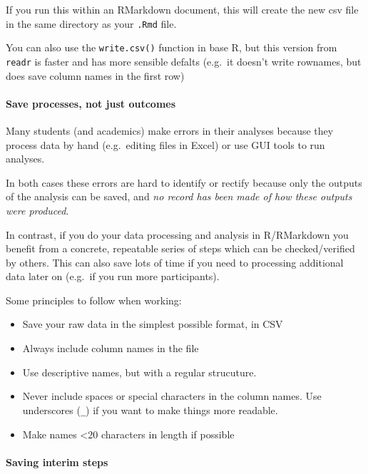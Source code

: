 \documentclass[]{article}
\let\oldparagraph\paragraph
\renewcommand{\paragraph}[1]{\oldparagraph{#1}\mbox{}}
\begin{document}
If you run this within an RMarkdown document, this will create the new csv file
in the same directory as your \texttt{.Rmd} file.

{You can also use the \texttt{write.csv()} function in base R, but this version from
\texttt{readr} is faster and has more sensible defalts (e.g.~it doesn't write rownames,
but does save column names in the first row)}

\hypertarget{save-intermediate-steps}{%
\paragraph{Save processes, not just outcomes}\label{save-intermediate-steps}}

Many students (and academics) make errors in their analyses because they process
data by hand (e.g.~editing files in Excel) or use GUI tools to run analyses.

In both cases these errors are hard to identify or rectify because only the
outputs of the analysis can be saved, and \emph{no record has been made of how these
outputs were produced}.

In contrast, if you do your data processing and analysis in R/RMarkdown you
benefit from a concrete, repeatable series of steps which can be
checked/verified by others. This can also save lots of time if you need to
processing additional data later on (e.g.~if you run more participants).

Some principles to follow when working:

\begin{itemize}
\item
  Save your raw data in the simplest possible format, in CSV
\item
  Always include column names in the file
\item
  Use descriptive names, but with a regular strucuture.
\item
  Never include spaces or special characters in the column names. Use
  underscores (\texttt{\_}) if you want to make things more readable.
\item
  Make names \textless{}20 characters in length if possible
\end{itemize}

\hypertarget{saving-interim-steps}{%
\paragraph{Saving interim steps}\label{saving-interim-steps}}
\end{document}
